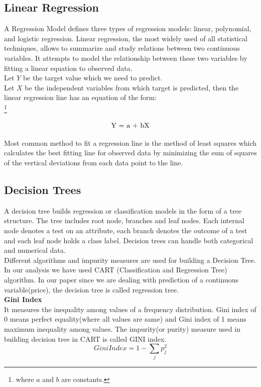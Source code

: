 \documentclass[fleqn,10pt]{SelfArx} %
\begin{document}
	\subsection{Linear Regression}
	
	A Regression Model defines three types of regression models: linear, polynomial, and logistic regression. Linear regression, the most widely used of all statistical techniques, allows to summarize and study relations between two continuous variables\cite{stat}. It attempts to model the relationship between these two variables by fitting a linear equation to observed data. \\
	
	Let $Y$ be the target value which we need to predict.\\
	
	Let $X$ be the independent variables from which target is predicted, then the linear regression line has an equation of the form:\\
	\footnote{where $a$ and $b$ are constants.}\centerline{\[ $Y = a + bX$\]}	
	
	
	Most common method to fit a regression line is the method of least squares which calculates the best fitting line for observed data by minimizing the sum of squares of the vertical deviations from each data point to the line. 
	
	\subsection{Decision Trees}
	A decision tree builds regression or classification models in the form of a tree structure. The tree includes root node, branches and leaf nodes. Each internal node denotes a test on an attribute, each branch denotes the outcome of a test and each leaf node holds a class label. Decision trees can handle both categorical and numerical data. \\
	Different algorithms and impurity measures are used for building a Decision Tree. In our analysis we have used CART (Classification and Regression Tree) algorithm. In our paper since we are dealing with prediction of a continuous  variable(price), the decision tree is called regression tree.\\
	
	\textbf{Gini Index}\\
	It measures the inequality among values of a frequency distribution. Gini index of 0 means perfect equality(where all values are same) and Gini index of 1 means maximum inequality among values. The impurity(or purity) measure used in building decision tree in CART is called GINI index.
	\[Gini Index = 1 - \sum_{j}p_j^2 \]
	
\end{document}

